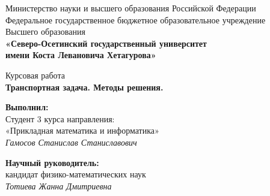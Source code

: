 \documentclass[a4paper,12pt]{article}
\begin{document}
\setcounter{page}{0}
\renewcommand{\labelenumii}{\arabic{enumi}.\arabic{enumii}.}


\begin{center}
	\small{Министерство науки и высшего образования Российской Федерации}\\
	\small{Федеральное государственное бюджетное образовательное учреждение}\\
	\small{Высшего образования}\\
	\small{\textbf{«Северо-Осетинский государственный университет\\
			имени Коста Левановича Хетагурова»}}\\
		
	\hfill \break
	\hfill \break
	\hfill \break
	\hfill \break
	\hfill \break
	\hfill \break
	\hfill \break
	\hfill \break
	\hfill \break
	
	\normalsize{Курсовая работа}\\
	\large{\textbf{Транспортная задача. Методы решения.}}\\
	
	\hfill \break
	\hfill \break
	\hfill \break
	\hfill \break
	\hfill \break
	\hfill\break
\end{center}

\begin{flushright}
	\textbf{Выполнил:}\\
	Студент 3 курса направления:\\
	«Прикладная математика и информатика»\\
	\textit{Гамосов Станислав Станиславович \underline{\hspace{3cm}}}\\
\end{flushright}

\hfill

\begin{flushright}
	\textbf{Научный руководитель:}\\
	кандидат физико-математических наук\\
	\textit{Тотиева Жанна Дмитриевна \underline{\hspace{3cm}}}\\
\end{flushright}
\end{document}
